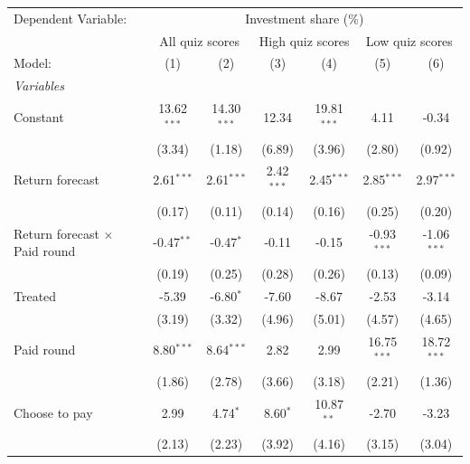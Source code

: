 \begingroup
\centering
\begin{tabular}{lcccccc}
   \tabularnewline \midrule \midrule
   Dependent Variable: & \multicolumn{6}{c}{Investment share (\%)}\\
    & \multicolumn{2}{c}{All quiz scores} & \multicolumn{2}{c}{High quiz scores} & \multicolumn{2}{c}{Low quiz scores} \\ 
   Model:                               & (1)           & (2)           & (3)           & (4)           & (5)           & (6)\\  
   \midrule
   \emph{Variables}\\
   Constant                             & 13.62$^{***}$ & 14.30$^{***}$ & 12.34         & 19.81$^{***}$ & 4.11          & -0.34\\   
                                        & (3.34)        & (1.18)        & (6.89)        & (3.96)        & (2.80)        & (0.92)\\   
   Return forecast                      & 2.61$^{***}$  & 2.61$^{***}$  & 2.42$^{***}$  & 2.45$^{***}$  & 2.85$^{***}$  & 2.97$^{***}$\\   
                                        & (0.17)        & (0.11)        & (0.14)        & (0.16)        & (0.25)        & (0.20)\\   
   Return forecast $\times$ Paid round  & -0.47$^{**}$  & -0.47$^{*}$   & -0.11         & -0.15         & -0.93$^{***}$ & -1.06$^{***}$\\   
                                        & (0.19)        & (0.25)        & (0.28)        & (0.26)        & (0.13)        & (0.09)\\   
   Treated                              & -5.39         & -6.80$^{*}$   & -7.60         & -8.67         & -2.53         & -3.14\\   
                                        & (3.19)        & (3.32)        & (4.96)        & (5.01)        & (4.57)        & (4.65)\\   
   Paid round                           & 8.80$^{***}$  & 8.64$^{***}$  & 2.82          & 2.99          & 16.75$^{***}$ & 18.72$^{***}$\\   
                                        & (1.86)        & (2.78)        & (3.66)        & (3.18)        & (2.21)        & (1.36)\\   
   Choose to pay                        & 2.99          & 4.74$^{*}$    & 8.60$^{*}$    & 10.87$^{**}$  & -2.70         & -3.23\\   
                                        & (2.13)        & (2.23)        & (3.92)        & (4.16)        & (3.15)        & (3.04)\\   

\end{tabular}
